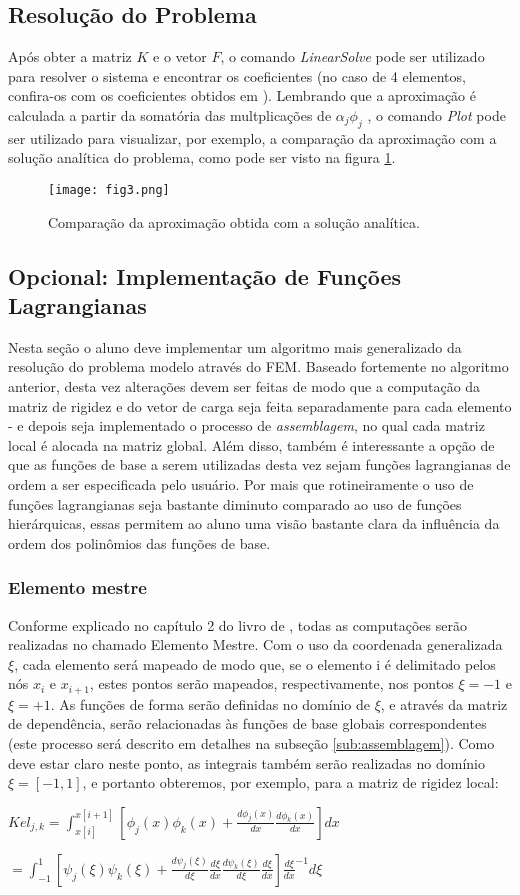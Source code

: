 \documentclass[11pt, oneside]{article}   	%
\begin{document}
\subsection{Resolução do Problema}
Após obter a matriz $K$ e o vetor $F$, o comando \emph{LinearSolve} pode ser utilizado para resolver o sistema e encontrar os coeficientes (no caso de 4 elementos, confira-os com os coeficientes obtidos em \citet{oden81}). Lembrando que a aproximação é calculada a partir da somatória das multplicações de $\alpha_{j}\phi_{j}$ , o comando \emph{Plot} pode ser utilizado para visualizar, por exemplo, a comparação da aproximação com a solução analítica do problema, como pode ser visto na figura \ref{fig:plotmath1}.
\begin{figure}[h!]
  \centering
      \texttt{[image: fig3.png]}
  \caption{Comparação da aproximação obtida com a solução analítica.}
  \label{fig:plotmath1}
\end{figure}

\subsection{Opcional: Implementação de Funções Lagrangianas}
\label{sub:math2}
Nesta seção o aluno deve implementar um algoritmo mais generalizado da resolução do problema modelo através do FEM. Baseado fortemente no algoritmo anterior, desta vez alterações devem ser feitas de modo que a computação da matriz de rigidez e do vetor de carga seja feita separadamente para cada elemento - e depois seja implementado o processo de \emph{assemblagem}, no qual cada matriz local é alocada na matriz global. Além disso, também é interessante a opção de que as funções de base a serem utilizadas desta vez sejam funções lagrangianas de ordem a ser especificada pelo usuário. Por mais que rotineiramente o uso de funções lagrangianas seja bastante diminuto comparado ao uso de funções hierárquicas, essas permitem ao aluno uma visão bastante clara da influência da ordem dos polinômios das funções de base.
\subsubsection{Elemento mestre}
Conforme explicado no capítulo 2 do livro de \citet{oden81}, todas as computações serão realizadas no chamado Elemento Mestre. Com o uso da coordenada generalizada $\xi$, cada elemento será mapeado de modo que, se o elemento i é delimitado pelos nós $x_{i}$ e $x_{i+1}$, estes pontos serão mapeados, respectivamente, nos pontos $\xi=-1$ e $\xi=+1$. As funções de forma serão definidas no domínio de $\xi$, e através da matriz de dependência, serão relacionadas às funções de base globais correspondentes (este processo será descrito em detalhes na subseção \ref{sub:assemblagem}). Como deve estar claro neste ponto, as integrais também serão realizadas no domínio $\xi=[-1,1]$, e portanto obteremos, por exemplo, para a matriz de rigidez local:
\centerline{$Kel_{j,k}=\int_{x[i]}^{x[i+1]}[\phi_{j}(x)\phi_{k}(x)+\frac{d\phi_{j}(x)}{dx}\frac{d\phi_{k}(x)}{dx}]dx$}
\centerline{$=\int_{-1}^{1}[\psi_{j}(\xi)\psi_{k}(\xi)+\frac{d\psi_{j}(\xi)}{d\xi}\frac{d\xi}{dx}\frac{d\psi_{k}(\xi)}{d\xi}\frac{d\xi}{dx}]\frac{d\xi}{dx}^{-1}d\xi$}
\end{document}
